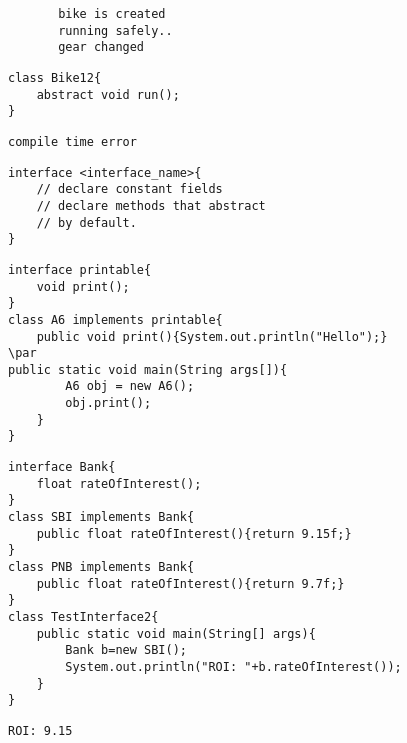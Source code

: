 \documentclass{book}
\def\lthtmlcheckvsize{\ifdim\ht\sizebox<\vsize 
  \ifdim\wd\sizebox<\hsize\expandafter\hfill\fi \expandafter\vfill
  \else\expandafter\vss\fi}%
\begin{document}
{\newpage\clearpage
{}%
\begin{lstlisting}
       bike is created
       running safely..
       gear changed
\end{lstlisting}%
\lthtmlfigureZ
\lthtmlcheckvsize\clearpage}

{\newpage\clearpage
{}%
\begin{lstlisting}
class Bike12{  
	abstract void run();  
}  
\end{lstlisting}%
\lthtmlfigureZ
\lthtmlcheckvsize\clearpage}

{\newpage\clearpage
{}%
\begin{lstlisting}
compile time error
\end{lstlisting}%
\lthtmlfigureZ
\lthtmlcheckvsize\clearpage}

{\newpage\clearpage
{}%
\begin{lstlisting}
interface <interface_name>{  
    // declare constant fields  
    // declare methods that abstract   
    // by default.  
}
\end{lstlisting}%
\lthtmlfigureZ
\lthtmlcheckvsize\clearpage}

{\newpage\clearpage
{}%
\begin{lstlisting}
interface printable{  
	void print();  
}  
class A6 implements printable{  
	public void print(){System.out.println("Hello");}  
\par
public static void main(String args[]){  
		A6 obj = new A6();  
		obj.print();  
	}  
}  
\end{lstlisting}%
\lthtmlfigureZ
\lthtmlcheckvsize\clearpage}

{\newpage\clearpage
{}%
\begin{lstlisting}
interface Bank{  
	float rateOfInterest();  
}  
class SBI implements Bank{  
	public float rateOfInterest(){return 9.15f;}  
}  
class PNB implements Bank{  
	public float rateOfInterest(){return 9.7f;}  
}  
class TestInterface2{  
	public static void main(String[] args){  
		Bank b=new SBI();  
		System.out.println("ROI: "+b.rateOfInterest());  
	}
}  
\end{lstlisting}%
\lthtmlfigureZ
\lthtmlcheckvsize\clearpage}

{\newpage\clearpage
{}%
\begin{lstlisting}
ROI: 9.15
\end{lstlisting}%
\lthtmlfigureZ
\lthtmlcheckvsize\clearpage}
\end{document}
